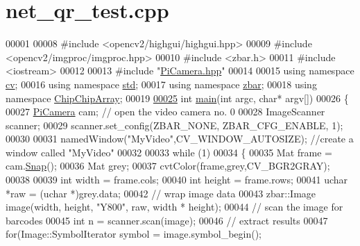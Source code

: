 \hypertarget{net__qr__test_8cpp_source}{\section{net\+\_\+qr\+\_\+test.\+cpp}
\label{net__qr__test_8cpp_source}
}

\begin{DoxyCode}
00001 
00008 \textcolor{preprocessor}{#include <opencv2/highgui/highgui.hpp>}
00009 \textcolor{preprocessor}{#include <opencv2/imgproc/imgproc.hpp>}
00010 \textcolor{preprocessor}{#include <zbar.h>}
00011 \textcolor{preprocessor}{#include <iostream>}
00012 
00013 \textcolor{preprocessor}{#include "\hyperlink{PiCamera_8hpp}{PiCamera.hpp}"}
00014 
00015 \textcolor{keyword}{using namespace }\hyperlink{namespacecv}{cv};
00016 \textcolor{keyword}{using namespace }\hyperlink{namespacestd}{std};
00017 \textcolor{keyword}{using namespace }\hyperlink{namespacezbar}{zbar};
00018 \textcolor{keyword}{using namespace }\hyperlink{namespaceChipChipArray}{ChipChipArray};
00019 
\hypertarget{net__qr__test_8cpp_source_l00025}{}\hyperlink{net__qr__test_8cpp_a0ddf1224851353fc92bfbff6f499fa97}{00025} \textcolor{keywordtype}{int} \hyperlink{net__qr__test_8cpp_a0ddf1224851353fc92bfbff6f499fa97}{main}(\textcolor{keywordtype}{int} argc, \textcolor{keywordtype}{char}* argv[])
00026 \{
00027     \hyperlink{classChipChipArray_1_1PiCamera}{PiCamera} cam; \textcolor{comment}{// open the video camera no. 0}
00028     ImageScanner scanner;  
00029     scanner.set\_config(ZBAR\_NONE, ZBAR\_CFG\_ENABLE, 1);  
00030 
00031     namedWindow(\textcolor{stringliteral}{"MyVideo"},CV\_WINDOW\_AUTOSIZE); \textcolor{comment}{//create a window called "MyVideo"}
00032 
00033     \textcolor{keywordflow}{while} (1)
00034     \{
00035         Mat frame = cam.\hyperlink{classChipChipArray_1_1PiCamera_a58fb0de02570dce9a9cb60a1a04fb84f}{Snap}();
00036         Mat grey;
00037         cvtColor(frame,grey,CV\_BGR2GRAY);
00038 
00039         \textcolor{keywordtype}{int} width = frame.cols;  
00040         \textcolor{keywordtype}{int} height = frame.rows;  
00041         uchar *raw = (uchar *)grey.data;  
00042         \textcolor{comment}{// wrap image data  }
00043         zbar::Image image(width, height, \textcolor{stringliteral}{"Y800"}, raw, width * height);  
00044         \textcolor{comment}{// scan the image for barcodes  }
00045         \textcolor{keywordtype}{int} n = scanner.scan(image);  
00046         \textcolor{comment}{// extract results  }
00047         \textcolor{keywordflow}{for}(Image::SymbolIterator symbol = image.symbol\_begin();  

\end{DoxyCode}
